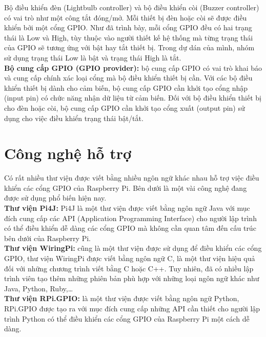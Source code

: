 \documentclass[12pt,a4paper,oneside]{extbook}
\begin{document}
\noindent
Bộ điều khiển đèn (Lightbulb controller) và bộ điều khiển còi (Buzzer controller) có vai trò như một công tắt đóng/mở. Mỗi thiết bị đèn hoặc còi sẽ được điều khiển bởi một cổng GPIO. Như đã trình bày, mỗi cổng GPIO đều có hai trạng thái là Low và High, tùy thuộc vào người thiết kế hệ thống mà từng trạng thái của GPIO sẽ tương ứng với bật hay tắt thiết bị. Trong dự dán của mình, nhóm sử dụng trạng thái Low là bật và trạng thái High là tắt.\\

\noindent
\textbf{Bộ cung cấp GPIO (GPIO provider):} bộ cung cấp GPIO có vai trò khai báo và cung cấp chính xác loại cổng mà bộ điều khiển thiết bị cần. Với các bộ điều khiển thiết bị dành cho cảm biến, bộ cung cấp GPIO cần khởi tạo cổng nhập (input pin) có chức năng nhận dữ liệu từ cảm biến. Đối với bộ điều khiển thiết bị cho đèn hoặc còi, bộ cung cấp GPIO cần khởi tạo cổng xuất (output pin) sử dụng cho việc điều khiển trạng thái bật/tắt.

\section{Công nghệ hỗ trợ}
Có rất nhiều thư viện được viết bằng nhiều ngôn ngữ khác nhau hỗ trợ việc điều khiển các cổng GPIO của Raspberry Pi. Bên dưới là một vài công nghệ đang được sử dụng phổ biến hiện nay.\\

\noindent
\textbf{Thư viện Pi4J:} Pi4J là một thư viện được viết bằng ngôn ngữ Java với mục đích cung cấp các API (Application Programming Interface) cho người lập trình có thể điều khiển dễ dàng các cổng GPIO mà không cần quan tâm đến cấu trúc bên dưới của Raspberry Pi.\\

\noindent
\textbf{Thư viện WiringPi:} cũng là một thư viện được sử dụng để điều khiển các cổng GPIO, thư viện WiringPi được viết bằng ngôn ngữ C, là một thư viện hiệu quả đối với những chương trình viết bằng C hoặc C++. Tuy nhiên, đã có nhiều lập trình viên tạo thêm những phiên bản phù hợp với những loại ngôn ngữ khác như Java, Python, Ruby,\dots\\

\noindent
\textbf{Thư viện RPi.GPIO:} là một thư viện được viết bằng ngôn ngữ Python, RPi.GPIO được tạo ra với mục đích cung cấp những API cần thiết cho người lập trình Python có thể điều khiển các cổng GPIO của Raspberry Pi một cách dễ dàng.\\
\end{document}
